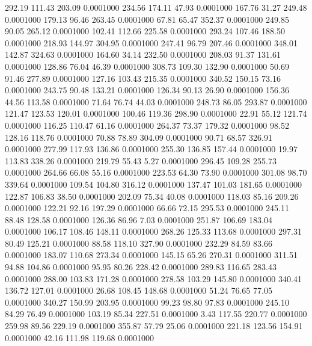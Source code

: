  292.19  111.43  203.09   0.0001000
 234.56  174.11   47.93   0.0001000
 167.76   31.27  249.48   0.0001000
 179.13   96.46  263.45   0.0001000
  67.81   65.47  352.37   0.0001000
 249.85   90.05  265.12   0.0001000
 102.41  112.66  225.58   0.0001000
 293.24  107.46  188.50   0.0001000
 218.93  144.97  304.95   0.0001000
 247.41   96.79  207.46   0.0001000
 348.01  142.87  324.63   0.0001000
 164.60   34.14  232.50   0.0001000
 208.03   91.37  131.61   0.0001000
 128.86   76.04   46.39   0.0001000
 308.73  109.30  132.90   0.0001000
  50.69   91.46  277.89   0.0001000
 127.16  103.43  215.35   0.0001000
 340.52  150.15   73.16   0.0001000
 243.75   90.48  133.21   0.0001000
 126.34   90.13   26.90   0.0001000
 156.36   44.56  113.58   0.0001000
  71.64   76.74   44.03   0.0001000
 248.73   86.05  293.87   0.0001000
 121.47  123.53  120.01   0.0001000
 100.46  119.36  298.90   0.0001000
  22.91   55.12  121.74   0.0001000
 116.25  110.47   61.16   0.0001000
 264.37   73.37  179.32   0.0001000
  98.52  128.16  118.76   0.0001000
  70.88   78.89  304.09   0.0001000
  90.71   68.57  326.91   0.0001000
 277.99  117.93  136.86   0.0001000
 255.30  136.85  157.44   0.0001000
  19.97  113.83  338.26   0.0001000
 219.79   55.43    5.27   0.0001000
 296.45  109.28  255.73   0.0001000
 264.66   66.08   55.16   0.0001000
 223.53   64.30   73.90   0.0001000
 301.08   98.70  339.64   0.0001000
 109.54  104.80  316.12   0.0001000
 137.47  101.03  181.65   0.0001000
 122.87  106.83   38.50   0.0001000
 202.09   75.34   40.08   0.0001000
 118.03   85.16  209.26   0.0001000
 122.21   92.16  197.29   0.0001000
  66.66   72.15  295.53   0.0001000
 245.11   88.48  128.58   0.0001000
 126.36   86.96    7.03   0.0001000
 251.87  106.69  183.04   0.0001000
 106.17  108.46  148.11   0.0001000
 268.26  125.33  113.68   0.0001000
 297.31   80.49  125.21   0.0001000
  88.58  118.10  327.90   0.0001000
 232.29   84.59   83.66   0.0001000
 183.07  110.68  273.34   0.0001000
 145.15   65.26  270.31   0.0001000
 311.51   94.88  104.86   0.0001000
  95.95   80.26  228.42   0.0001000
 289.83  116.65  283.43   0.0001000
 288.00  103.83  171.28   0.0001000
 278.58  103.29  145.80   0.0001000
 340.41  136.72  127.01   0.0001000
  26.68  108.45  148.68   0.0001000
  51.24   76.65   77.05   0.0001000
 340.27  150.99  203.95   0.0001000
  99.23   98.80   97.83   0.0001000
 245.10   84.29   76.49   0.0001000
 103.19   85.34  227.51   0.0001000
   3.43  117.55  220.77   0.0001000
 259.98   89.56  229.19   0.0001000
 355.87   57.79   25.06   0.0001000
 221.18  123.56  154.91   0.0001000
  42.16  111.98  119.68   0.0001000
